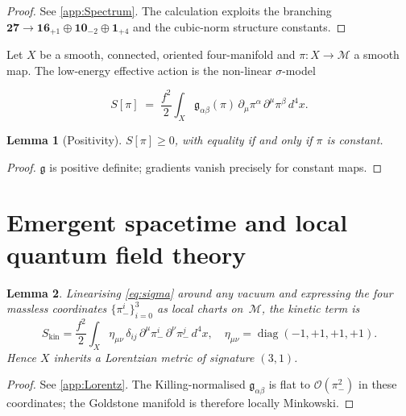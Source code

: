 \documentclass[pdflatex,sn-mathphys-num]{sn-jnl}
\theoremstyle{thmstyleone}
\newtheorem{lemma}[lemma]{Lemma}
\theoremstyle{thmstyletwo}%
\theoremstyle{thmstylethree}%
\begin{document}
\begin{proof}
See \autoref{app:Spectrum}.  The calculation exploits the branching
\(\mathbf{27}\to\mathbf{16}_{+1}\oplus\mathbf{10}_{-2}\oplus\mathbf 1_{+4}\)
and the cubic-norm structure constants.
\end{proof}

Let $X$ be a smooth, connected, oriented four-manifold and $\pi: X\to\mathcal M$
a smooth map.  The low-energy effective action is the non-linear $\sigma$-model

\begin{equation}\label{eq:sigma}
  S[\pi]
  \;=\;
  \frac{f^{2}}2
  \int_{X}
     \mathfrak g_{\alpha\beta}(\pi)\,
     \partial_{\mu}\pi^{\alpha}\,
     \partial^{\mu}\pi^{\beta}\,d^{4}x .
\end{equation}

\begin{lemma}[Positivity]\label{lem:PosSigma}
$S[\pi]\ge0$, with equality if and only if $\pi$ is constant.
\end{lemma}

\begin{proof}
$\mathfrak g$ is positive definite; gradients vanish precisely for
constant maps.
\end{proof}

\section{Emergent spacetime and local quantum field theory}
\label{sec:5}

\begin{lemma}\label{lem:InducedMetric}
Linearising \eqref{eq:sigma} around any vacuum and expressing
the four massless coordinates $\{\pi_-^{i}\}_{i=0}^{3}$
as local charts on~$\mathcal M$,
the kinetic term is
\[
  S_{\text{kin}}
  = \frac{f^{2}}2 \int_{X}
      \eta_{\mu\nu}\,
      \delta_{ij}\,
      \partial^{\mu}\pi_-^{i}\,\partial^{\nu}\pi_-^{j} \, d^{4}x,
  \quad
  \eta_{\mu\nu}=\operatorname{diag}(-1,+1,+1,+1).
\]
Hence $X$ inherits a Lorentzian metric of signature $(3,1)$.
\end{lemma}

\begin{proof}
See \autoref{app:Lorentz}. The Killing-normalised
$\mathfrak g_{\alpha\beta}$ is flat to $\mathcal O(\pi_-^{2})$ in these
coordinates; the Goldstone manifold is therefore locally Minkowski.
\end{proof}
\end{document}

